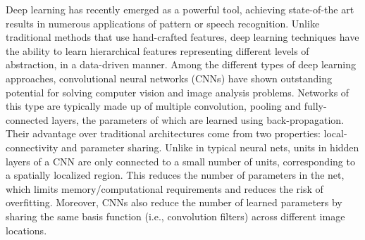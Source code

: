 \documentclass[twoside,fleqn,espcrc2]{elsarticle}
\begin{document}
Deep learning has recently emerged as a powerful tool, achieving state-of-the art results in numerous applications of pattern or speech recognition. Unlike traditional methods that use hand-crafted features, deep learning techniques have the ability to learn hierarchical features representing different levels of abstraction, in a data-driven manner. Among the different types of deep learning approaches, convolutional neural networks (CNNs) \cite{lecun1998gradient,krizhevsky2012imagenet} have shown outstanding potential for solving computer vision and image analysis problems. Networks of this type are typically made up of multiple convolution, pooling and fully-connected layers, the parameters of which are learned using back-propagation. Their advantage over traditional architectures come from two properties: local-connectivity and parameter sharing. Unlike in typical neural nets, units in hidden layers of a CNN are only connected to a small number of units, corresponding to a spatially localized region. This reduces the number of parameters in the net, which limits memory/computational requirements and reduces the risk of overfitting. Moreover, CNNs also reduce the number of learned parameters by sharing the same basis function (i.e., convolution filters) across different image locations.
\end{document}

